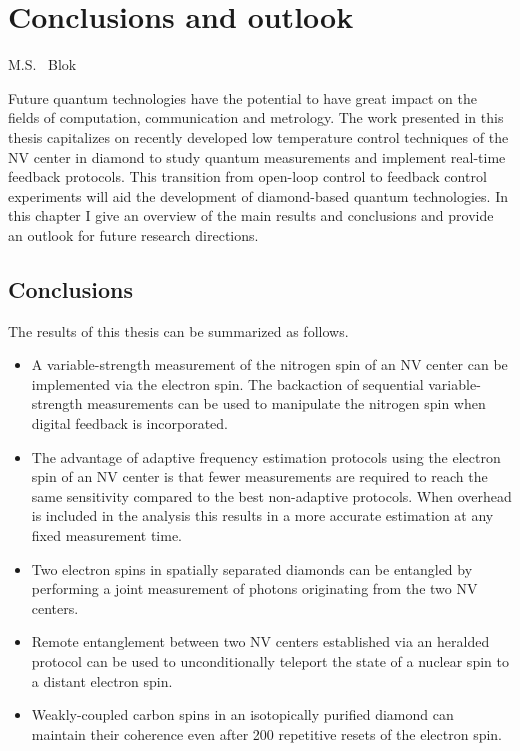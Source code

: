 \graphicspath{{./ch_conclusion_and_outlook/figures/}}

\chapter{Conclusions and outlook}
\label{ch:conclusion}

\begin{center} 
    \vspace{-1cm} {M.S. ~Blok} 
\end{center}

Future quantum technologies have the potential to have great impact on the fields of computation, communication and metrology. The work presented in this thesis capitalizes on recently developed low temperature control techniques of the NV center in diamond to study quantum measurements and implement real-time feedback protocols. This transition from open-loop control to feedback control experiments will aid the development of diamond-based quantum technologies. In this chapter I give an overview of the main results and conclusions and provide an outlook for future research directions.
\clearpage

\section{Conclusions}
The results of this thesis can be summarized as follows.
\begin{itemize}

  \item A variable-strength measurement of the nitrogen spin of an NV center can be implemented via the electron spin. The backaction of sequential variable-strength measurements can be used to manipulate the nitrogen spin when digital feedback is incorporated.

  \item The advantage of adaptive frequency estimation protocols using the electron spin of an NV center is that fewer measurements are required to reach the same sensitivity compared to the best non-adaptive protocols. When overhead is included in the analysis this results in a more accurate estimation at any fixed measurement time.

  \item Two electron spins in spatially separated diamonds can be entangled by performing a joint measurement of photons originating from the two NV centers. 

  \item Remote entanglement between two NV centers established via an heralded protocol can be used to unconditionally teleport the state of a nuclear spin to a distant electron spin.

  \item Weakly-coupled carbon spins in an isotopically purified diamond can maintain their coherence even after 200 repetitive resets of the electron spin.
  
\end{itemize}


